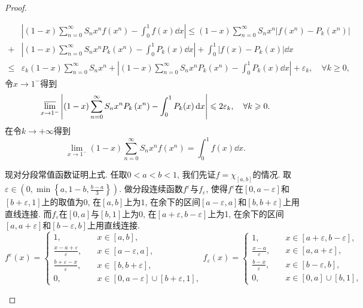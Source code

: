 \begin{quizb}
\begin{proof}
\begin{asparaenum}[\bfseries (1)]
\[\begin{split}
&\left|(1-x)\sum_{n=0}^{\infty}S_nx^nf\left(x^n\right)-\int_{0}^{1}f(x)\dd x\right|\leqslant (1-x)\sum_{n=0}^{\infty}S_nx^n\left|f\left(x^n\right)-P_k\left(x^n\right)\right|\\+&\left|(1-x)\sum_{n=0}^{\infty}S_nx^nP_k\left(x^n\right)-\int_{0}^{1}P_k(x)\dd x\right|+\int_{0}^{1}\left|f(x)-P_k(x)\right|\dd x\\\leqslant&\varepsilon_k(1-x)\sum_{n=0}^{\infty}S_nx^n+\left|(1-x)\sum_{n=0}^{\infty}S_nx^nP_k\left(x^n\right)-\int_{0}^{1}P_k(x)\dd x\right|+\varepsilon_k,\quad \forall k\geqslant 0,
\end{split}\]令\(x\rightarrow 1^-\)得到\[\varlimsup_{x\rightarrow 1^-}\left|(1-x)\sum_{n=0}^{\infty}S_nx^nP_k\left(x^n\right)-\int_{0}^{1}P_k(x)\,\mathrm{d} x\right|\leqslant 2\varepsilon_k,\quad\forall k\geqslant 0.\]在令\(k\rightarrow+\infty\)得到\[\lim_{x\rightarrow 1^-}(1-x)\sum_{n=0}^{\infty}S_nx^nf\left(x^n\right)=\int_{0}^{1}f(x)\dd x.\]
\item 现对分段常值函数证明上式. 任取\(0<a<b<1\), 我们先证\(f=\chi_{[a,b]}\)的情况. 取\(\varepsilon\in\left(0,\min\left\lbrace a,1-b,\frac{b-a}{3}\right\rbrace \right)\). 做分段连续函数\(f^{\varepsilon}\)与\(f_{\varepsilon}\), 使得\(f^{\varepsilon}\)在\([0,a-\varepsilon]\)和\([b+\varepsilon,1]\)上的取值为\(0\), 在\([a,b]\)上为\(1\), 在余下的区间\([a-\varepsilon,a]\)和\([b,b+\varepsilon]\)上用直线连接. 而\(f_\varepsilon\)在\([0,a]\)与\([b,1]\)上为\(0\), 在\([a+\varepsilon,b-\varepsilon]\)上为1, 在余下的区间\([a,a+\varepsilon]\)和\([b-\varepsilon,b]\)上用直线连接. \[f^\varepsilon(x)=\begin{cases}
1, & x\in[a,b],\\
\frac{x-a+\varepsilon}{\varepsilon},\quad&x\in[a-\varepsilon,a],\\
\frac{b+\varepsilon-x}{\varepsilon},&x\in[b,b+\varepsilon],\\
0,&x\in[0,a-\varepsilon]\cup[b+\varepsilon,1],
\end{cases}
f_\varepsilon(x)=\begin{cases}
1, & x\in[a+\varepsilon,b-\varepsilon],\\
\frac{x-a}{\varepsilon},\quad&x\in[a,a+\varepsilon],\\
\frac{b-x}{\varepsilon},&x\in[b-\varepsilon,b],\\
0,&x\in[0,a]\cup[b,1],

\end{cases}\]
\end{asparaenum}
\end{proof}
\end{quizb}
